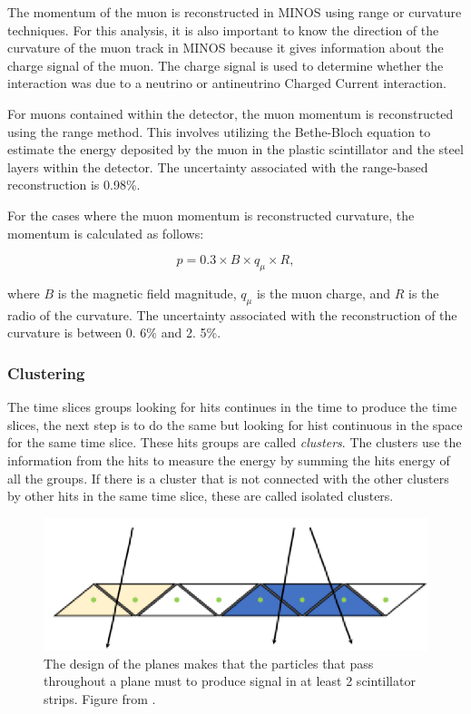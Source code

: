 The momentum of the muon is reconstructed in MINOS using range or curvature techniques. For this analysis, it is also important to know the direction of the curvature of the muon track in MINOS because it gives information about the charge signal of the muon. The charge signal is used to determine whether the interaction was due to a neutrino or antineutrino Charged Current interaction.

For muons contained within the detector, the muon momentum is reconstructed using the range method. This involves utilizing the Bethe-Bloch equation to estimate the energy deposited by the muon in the plastic scintillator and the steel layers within the detector. The uncertainty associated with the range-based reconstruction is 0.98\%. 

For the cases where the muon momentum is reconstructed curvature, the momentum is calculated as follows:

\begin{equation}
    p = 0.3\times B \times q_\mu \times R,
\end{equation}

where $B$ is the magnetic field magnitude, $q_\mu$ is the muon charge, and $R$ is the radio of the curvature. The uncertainty associated with the reconstruction of the curvature is between 0. 6\% and 2. 5\%. 



\subsubsection{Clustering}
\label{Cap:MnvExp:MnvDetector:DataReconstruction:Clustering}

The time slices groups looking for hits continues in the time to produce the time slices, the next step is to do the same but looking for hist continuous in the space for the same time slice. These hits groups are called \textit{ clusters}. The clusters use the information from the hits to measure the energy by summing the hits energy of all the groups. If there is a cluster that is not connected with the other clusters by other hits in the same time slice, these are called isolated clusters.

\begin{figure}[!htb]
    \centering
    \includegraphics[scale=0.5]{Figures/Chapter2/ClusterFormation.png}
    \caption{The design of the planes makes that the particles that pass throughout a plane must to produce signal in at least 2 scintillator strips. Figure from \cite{AaronThesis}.}
    \label{fig:MnvExp:MnvDetector:DataReconstruction:Clustering:ClusterFormation}
\end{figure}


